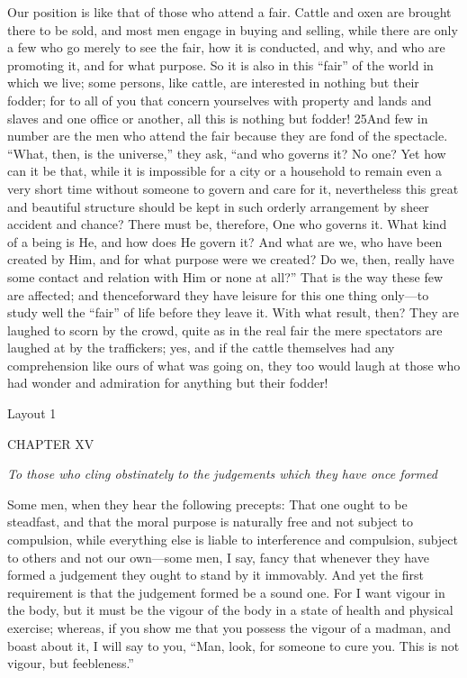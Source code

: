 Our position is like that of those who attend a fair. Cattle and oxen are brought there to be sold, and most men engage in buying and selling, while there are only a few who go merely to see the fair, how it is conducted, and why, and who are promoting it, and for what purpose. So it is also in this ``fair'' of the world in which we live; some persons, like cattle, are interested in nothing but their fodder; for to all of you that concern yourselves with property and lands and slaves and one office or another, all this is nothing but fodder! 25And few in number are the men who attend the fair because they are fond of the spectacle. ``What, then, is the universe,'' they ask, ``and who governs it? No one? Yet how can it be that, while it is impossible for a city or a household to remain even a very short time without someone to govern and care for it, nevertheless this great and beautiful structure should be kept in such orderly arrangement by sheer accident and chance? There must be, therefore, One who governs it. What kind of a being is He, and how does He govern it? And what are we, who have been created by Him, and for what purpose were we created? Do we, then, really have some contact and relation with Him or none at all?'' That is the way these few are affected; and thenceforward they have leisure for this one thing only—to study well the ``fair'' of life before they leave it. With what result, then? They are laughed to scorn by the crowd, quite as in the real fair the mere spectators are laughed at by the traffickers; yes, and if the cattle themselves had any comprehension like ours of what was going on, they too would laugh at those who had wonder and admiration for anything but their fodder!



Layout 1

CHAPTER XV

\emph{To those who cling obstinately to the judgements which they have once formed}

Some men, when they hear the following precepts: That one ought to be steadfast, and that the moral purpose is naturally free and not subject to compulsion, while everything else is liable to interference and compulsion, subject to others and not our own—some men, I say, fancy that whenever they have formed a judgement they ought to stand by it immovably. And yet the first requirement is that the judgement formed be a sound one. For I want vigour in the body, but it must be the vigour of the body in a state of health and physical exercise; whereas, if you show me that you possess the vigour of a madman, and boast about it, I will say to you, ``Man, look, for someone to cure you. This is not vigour, but feebleness.''

